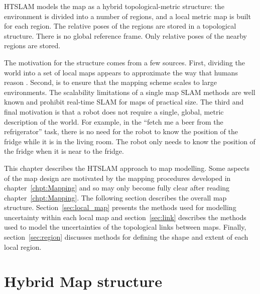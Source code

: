 HTSLAM models the map as a hybrid topological-metric structure: the
environment is divided into a number of regions, and a local metric
map is built for each region. The relative poses of the regions are
stored in a topological structure. There is no global reference
frame. Only relative poses of the nearby regions are stored.

The motivation for the structure comes from a few sources. First,
dividing the world into a set of local maps appears to approximate the
way that humans reason \cite{psycho_kuipers82}. Second, is to ensure
that the mapping scheme scales to large environments.  The scalability
limitations of a single map SLAM methods are well known
\cite{guivant03,guivant01,guivant02} and prohibit real-time SLAM for
maps of practical size.  The third and final motivation is that a
robot does not require a single, global, metric description of the
world.  For example, in the ``fetch me a beer from the refrigerator''
task, there is no need for the robot to know the position of the
fridge while it is in the living room.  The robot only needs to know
the position of the fridge when it is near to the fridge.

This chapter describes the HTSLAM approach to map modelling.  Some
aspects of the map design are motivated by the mapping procedures
developed in chapter~\ref{chpt:Mapping} and so may only become fully
clear after reading chapter~\ref{chpt:Mapping}. The following section
describes the overall map structure.  Section~\ref{sec:local_map}
presents the methods used for modelling uncertainty within each local
map and section~\ref{sec:link} describes the methods used to model the
uncertainties of the topological links between maps.  Finally,
section~\ref{sec:region} discusses methods for defining the shape and
extent of each local region.

\section{Hybrid Map structure}
\label{sec:HM_structure}

